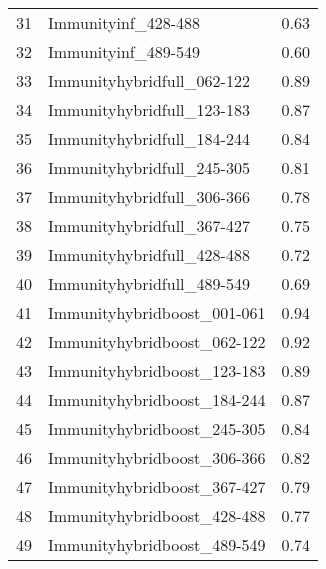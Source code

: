\begin{table}[ht]
\begin{tabular}{rlr}
  31 & Immunityinf\_428-488 & 0.63 \\ 
  32 & Immunityinf\_489-549 & 0.60 \\ 
  33 & Immunityhybridfull\_062-122 & 0.89 \\ 
  34 & Immunityhybridfull\_123-183 & 0.87 \\ 
  35 & Immunityhybridfull\_184-244 & 0.84 \\ 
  36 & Immunityhybridfull\_245-305 & 0.81 \\ 
  37 & Immunityhybridfull\_306-366 & 0.78 \\ 
  38 & Immunityhybridfull\_367-427 & 0.75 \\ 
  39 & Immunityhybridfull\_428-488 & 0.72 \\ 
  40 & Immunityhybridfull\_489-549 & 0.69 \\ 
  41 & Immunityhybridboost\_001-061 & 0.94 \\ 
  42 & Immunityhybridboost\_062-122 & 0.92 \\ 
  43 & Immunityhybridboost\_123-183 & 0.89 \\ 
  44 & Immunityhybridboost\_184-244 & 0.87 \\ 
  45 & Immunityhybridboost\_245-305 & 0.84 \\ 
  46 & Immunityhybridboost\_306-366 & 0.82 \\ 
  47 & Immunityhybridboost\_367-427 & 0.79 \\ 
  48 & Immunityhybridboost\_428-488 & 0.77 \\ 
  49 & Immunityhybridboost\_489-549 & 0.74 \\ 
   \hline
\end{tabular}
\end{table}
